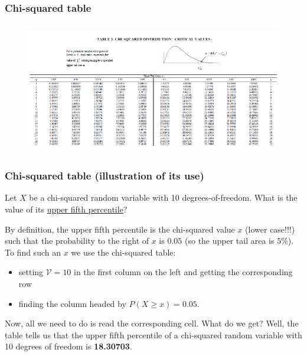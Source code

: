 \documentclass[notes=show,smaller,handout]{beamer}
\begin{document}
\begin{frame}%

\frametitle{Chi-squared table}


\begin{figure}[ptb]\centering
\includegraphics[height=2.2649in, width=4.9658in]{chisq_table__3.pdf}%
\end{figure}

\end{frame}%

\begin{frame}%

\frametitle{Chi-squared table (illustration of its use)}

\begin{example}

Let $X$ be a chi-squared random variable with 10 degrees-of-freedom. What is the value of its \underline{upper fifth percentile}? \vspace{0.6cm}

By definition, the upper fifth percentile is the chi-squared value $x$ (lower case!!!) such that the probability to the right of $x$ is $0.05$ (so the upper tail area is $5\%$).  To find such an $x$ we use the chi-squared table: \vspace{0.1cm}
\begin{itemize} 
\item setting $\mathcal{V} = 10$ in the first column on the left and getting the corresponding row \vspace{0.1cm}
\item finding the column headed by $P(X \geq x) = 0.05$. \vspace{0.1cm}
\end{itemize} 

Now, all we need to do is read the corresponding cell. What do we get? Well, the table tells us that the upper fifth percentile of a chi-squared random variable with 10 degrees of freedom is \textbf{18.30703}. 



\end{example}



\end{frame}%
\end{document}
